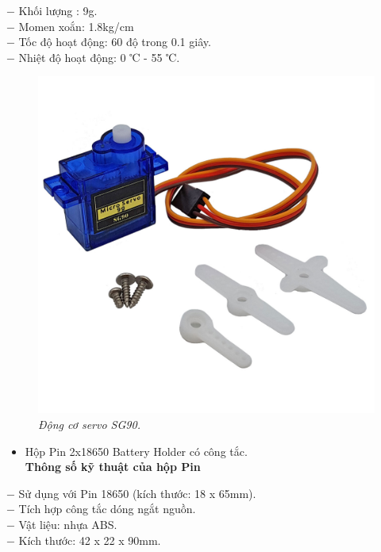 \documentclass[12pt,a4paper]{article}
\begin{document}
$-$ Khối lượng : 9g.\\
$-$ Momen xoắn: 1.8kg/cm\\
$-$ Tốc độ hoạt động: 60 độ trong 0.1 giây.\\
$-$ Nhiệt độ hoạt động: 0 ℃ - 55 ℃.\\
\begin{figure}[ht!]
    \centering
    \includegraphics[scale=0.18]{hinh 4.jpg}
    \caption{\textit{Động cơ servo SG90.}}
    \label{fig4}
\end{figure}
\newpage
\begin{itemize}
    \item Hộp Pin 2x18650 Battery Holder có công tắc.\\
    \textbf{Thông số kỹ thuật của hộp Pin}
\end{itemize}
$-$ Sử dụng với Pin 18650 (kích thước: 18 x 65mm).\\
$-$ Tích hợp công tắc dóng ngắt nguồn.\\ 
$-$ Vật liệu: nhựa ABS.\\
$-$ Kích thước: 42 x 22 x 90mm.\\
\end{document}
